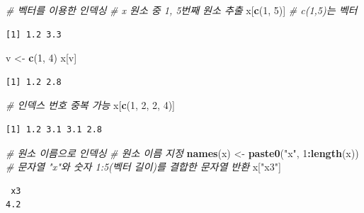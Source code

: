 \documentclass[
  11pt,
]{krantz}
\newenvironment{Shaded}{\begin{snugshade}}{\end{snugshade}}
\newcommand{\CommentTok}[1]{\textcolor[rgb]{0.37,0.37,0.37}{\textit{#1}}}
\newcommand{\DecValTok}[1]{\textcolor[rgb]{0.06,0.06,0.06}{#1}}
\newcommand{\KeywordTok}[1]{\textcolor[rgb]{0.27,0.27,0.27}{\textbf{#1}}}
\newcommand{\NormalTok}[1]{#1}
\newcommand{\OperatorTok}[1]{\textcolor[rgb]{0.43,0.43,0.43}{\textbf{#1}}}
\newcommand{\StringTok}[1]{\textcolor[rgb]{0.5,0.5,0.5}{#1}}
\begin{document}
\footnotesize

\begin{Shaded}
\begin{Highlighting}[]
\CommentTok{# 벡터를 이용한 인덱싱}
\CommentTok{# x 원소 중 1, 5번째 원소 추출}
\NormalTok{x[}\KeywordTok{c}\NormalTok{(}\DecValTok{1}\NormalTok{, }\DecValTok{5}\NormalTok{)] }\CommentTok{# c(1,5)는 벡터}
\end{Highlighting}
\end{Shaded}

\begin{verbatim}
[1] 1.2 3.3
\end{verbatim}

\begin{Shaded}
\begin{Highlighting}[]
\NormalTok{v <-}\StringTok{ }\KeywordTok{c}\NormalTok{(}\DecValTok{1}\NormalTok{, }\DecValTok{4}\NormalTok{)}
\NormalTok{x[v]}
\end{Highlighting}
\end{Shaded}

\begin{verbatim}
[1] 1.2 2.8
\end{verbatim}

\begin{Shaded}
\begin{Highlighting}[]
\CommentTok{# 인덱스 번호 중복 가능}
\NormalTok{x[}\KeywordTok{c}\NormalTok{(}\DecValTok{1}\NormalTok{, }\DecValTok{2}\NormalTok{, }\DecValTok{2}\NormalTok{, }\DecValTok{4}\NormalTok{)]}
\end{Highlighting}
\end{Shaded}

\begin{verbatim}
[1] 1.2 3.1 3.1 2.8
\end{verbatim}

\begin{Shaded}
\begin{Highlighting}[]
\CommentTok{# 원소 이름으로 인덱싱}
\CommentTok{# 원소 이름 지정}
\KeywordTok{names}\NormalTok{(x) <-}\StringTok{ }\KeywordTok{paste0}\NormalTok{(}\StringTok{"x"}\NormalTok{, }\DecValTok{1}\OperatorTok{:}\KeywordTok{length}\NormalTok{(x)) }\CommentTok{# 문자열 "x"와 숫자 1:5(벡터 길이)를 결합한 문자열 반환}
\NormalTok{x[}\StringTok{"x3"}\NormalTok{]}
\end{Highlighting}
\end{Shaded}

\begin{verbatim}
 x3 
4.2 
\end{verbatim}
\end{document}
